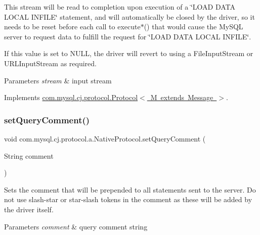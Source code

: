 This stream will be read to completion upon execution of a \char`\"{}\+L\+O\+A\+D D\+A\+T\+A L\+O\+C\+A\+L I\+N\+F\+I\+L\+E\char`\"{} statement, and will automatically be closed by the driver, so it needs to be reset before each call to execute$\ast$() that would cause the My\+S\+QL server to request data to fulfill the request for \char`\"{}\+L\+O\+A\+D D\+A\+T\+A L\+O\+C\+A\+L I\+N\+F\+I\+L\+E\char`\"{}.

If this value is set to N\+U\+LL, the driver will revert to using a File\+Input\+Stream or U\+R\+L\+Input\+Stream as required.


\begin{DoxyParams}{Parameters}
{\em stream} & input stream \\
\hline
\end{DoxyParams}


Implements \mbox{\hyperlink{interfacecom_1_1mysql_1_1cj_1_1protocol_1_1_protocol_a995483a591a66d63e273140ef0ac47e7}{com.\+mysql.\+cj.\+protocol.\+Protocol$<$ M extends Message $>$}}.

\mbox{\label{classcom_1_1mysql_1_1cj_1_1protocol_1_1a_1_1_native_protocol_a31d74c4c65825a8c0b875831e4884f58}} 
\subsubsection{\texorpdfstring{set\+Query\+Comment()}{setQueryComment()}}
{\footnotesize\ttfamily void com.\+mysql.\+cj.\+protocol.\+a.\+Native\+Protocol.\+set\+Query\+Comment (\begin{DoxyParamCaption}\item[{String}]{comment }\end{DoxyParamCaption})}

Sets the comment that will be prepended to all statements sent to the server. Do not use slash-\/star or star-\/slash tokens in the comment as these will be added by the driver itself.


\begin{DoxyParams}{Parameters}
{\em comment} & query comment string \\
\hline
\end{DoxyParams}


